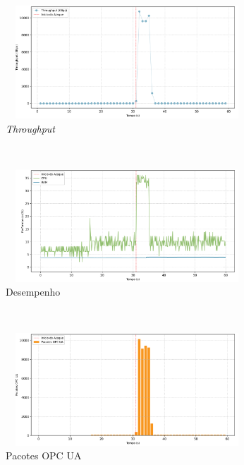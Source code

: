 \begin{apendicesenv}
\begin{figure}[htbp!]
    \centering
    \caption{\label{fig:1-dos_function_call_null_deref}Gráficos do ataque de DoS pela chamada da função \textit{Dereference} nula - nível de segurança: `Sign'.}
    \begin{subfigure}[t]{0.5\textwidth}
        \centering
        \caption{\textit{Throughput}}
        \includegraphics[width=1\textwidth, height=120pt]{USPSC-img/output/cropped/1-dos_function_call_null_deref-tput.png}
    \end{subfigure}%
    ~ 
    \begin{subfigure}[t]{0.5\textwidth}
        \centering
        \caption{Desempenho}
        \includegraphics[width=1\textwidth, height=120pt]{USPSC-img/output/cropped/1-dos_function_call_null_deref-perf.png}
    \end{subfigure}%
    \\
    \begin{subfigure}[t]{0.5\textwidth}
        \centering
        \caption{Pacotes OPC UA}
        \includegraphics[width=1\textwidth, height=120pt]{USPSC-img/output/cropped/1-dos_function_call_null_deref-pack.png}
    \end{subfigure}%
    ~
    \begin{subfigure}[t]{0.5\textwidth}

\end{subfigure}
\end{figure}
\end{apendicesenv}
